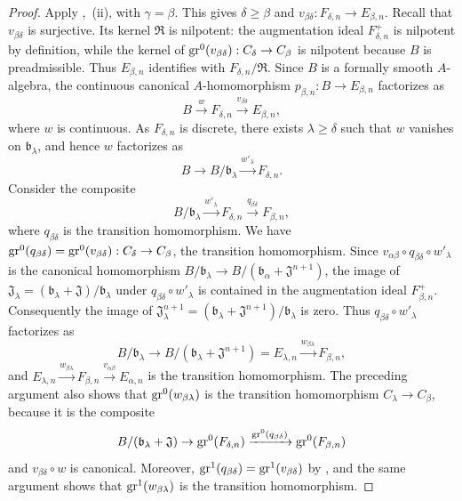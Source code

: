 \begin{proof}
Apply ,~{\rm(ii)}, with $\gamma=\beta$.
This gives $\delta\geq\beta$ and
$v_{\beta\delta}:F_{\delta,n}\to E_{\beta,n}$.
Recall that $v_{\beta\delta}$ is surjective.
Its kernel $\mathfrak{R}$ is nilpotent: the augmentation ideal
$F_{\delta,n}^+$ is nilpotent by definition, while the kernel of
$\operatorname{gr}^0(v_{\beta\delta}):C_\delta\to C_\beta$ is nilpotent because $B$ is
preadmissible.
Thus $E_{\beta,n}$ identifies with $F_{\delta,n}/\mathfrak{R}$.
Since $B$ is a formally smooth $A$-algebra, the continuous canonical
$A$-homomorphism $p_{\beta,n}:B\to E_{\beta,n}$ factorizes as
\[
  B\xrightarrow{w}F_{\delta,n}
  \xrightarrow{v_{\beta\delta}}E_{\beta,n},
\]
where $w$ is continuous.
As $F_{\delta,n}$ is discrete, there exists $\lambda\geq\delta$ such that $w$
vanishes on $\mathfrak{b}_\lambda$, and hence $w$ factorizes as
\[
  B\to B/\mathfrak{b}_\lambda
  \xrightarrow{w'_\lambda}F_{\delta,n}.
\]
Consider the composite
\[
  B/\mathfrak{b}_\lambda\xrightarrow{w'_\lambda}F_{\delta,n}
  \xrightarrow{q_{\beta\delta}}F_{\beta,n},
\]
where $q_{\beta\delta}$ is the transition homomorphism.
We have
$\operatorname{gr}^0(q_{\beta\delta})=\operatorname{gr}^0(v_{\beta\delta}):C_\delta\to C_\beta$,
the transition homomorphism.
Since
$v_{\alpha\beta}\circ q_{\beta\delta}\circ w'_\lambda$
is the canonical homomorphism
$B/\mathfrak{b}_\lambda\to
B/(\mathfrak{b}_\alpha+\mathfrak{J}^{n+1})$,
the image of
$\mathfrak{J}_\lambda=(\mathfrak{b}_\lambda+\mathfrak{J})/
\mathfrak{b}_\lambda$
under $q_{\beta\delta}\circ w'_\lambda$ is contained in the augmentation ideal
$F_{\beta,n}^+$.
Consequently the image of
$\mathfrak{J}_\lambda^{n+1}
=(\mathfrak{b}_\lambda+\mathfrak{J}^{n+1})/\mathfrak{b}_\lambda$
is zero.
Thus $q_{\beta\delta}\circ w'_\lambda$ factorizes as
\[
  B/\mathfrak{b}_\lambda\to
  B/(\mathfrak{b}_\lambda+\mathfrak{J}^{n+1})=E_{\lambda,n}
  \xrightarrow{w_{\beta\lambda}}F_{\beta,n},
\]
and
$E_{\lambda,n}\xrightarrow{w_{\beta\lambda}}F_{\beta,n}
\xrightarrow{v_{\alpha\beta}}E_{\alpha,n}$
is the transition homomorphism.
The preceding argument also shows that $\operatorname{gr}^0(w_{\beta\lambda})$ is the
transition homomorphism $C_\lambda\to C_\beta$, because it is the composite
\[
  B/(\mathfrak{b}_\lambda+\mathfrak{J})
  \to\operatorname{gr}^0(F_{\delta,n})
  \xrightarrow{\operatorname{gr}^0(q_{\beta\delta})}\operatorname{gr}^0(F_{\beta,n})
\]
and $v_{\beta\delta}\circ w$ is canonical.
Moreover,
$\operatorname{gr}^1(q_{\beta\delta})=\operatorname{gr}^1(v_{\beta\delta})$ by
, and the same argument shows that
$\operatorname{gr}^1(w_{\beta\lambda})$ is the transition homomorphism.
\end{proof}

